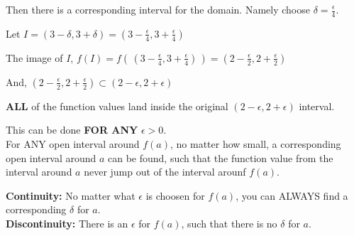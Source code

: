 \documentclass{ximera}
\begin{document}
\begin{example}
\begin{explanation}
Then there is a corresponding interval for the domain. Namely choose $\delta = \frac{\epsilon}{4}$.

Let $I = (3 - \delta, 3 + \delta) = \left(3 - \frac{\epsilon}{4}, 3 + \frac{\epsilon}{4}\right)$


The image of $I$, $f(I) = f\left(\,\left(3 - \frac{\epsilon}{4}, 3 + \frac{\epsilon}{4}\right)\,\right) = \left(2 - \frac{\epsilon}{2}, 2 + \frac{\epsilon}{2}\right)$

And, $\left(2 - \frac{\epsilon}{2}, 2 + \frac{\epsilon}{2}\right) \subset  (2 - \epsilon, 2 + \epsilon) $


\textbf{ALL} of the function values land inside the original $(2 - \epsilon, 2 + \epsilon)$ interval.


This can be done \textbf{\textcolor{red!80!black}{FOR ANY}} $\epsilon > 0$. \\


For ANY open interval around $f(a)$, no matter how small, a corresponding open interval around $a$ can be found, such that the function value from the interval around $a$ never jump out of the interval arounf $f(a)$.










\end{explanation}
\end{example}





\textbf{Continuity:} No matter what $\epsilon$ is choosen for $f(a)$, you can ALWAYS find a corresponding $\delta$ for $a$. \\



\textbf{Discontinuity:} There is an $\epsilon$ for $f(a)$, such that there is no $\delta$ for $a$. \\
\end{document}

